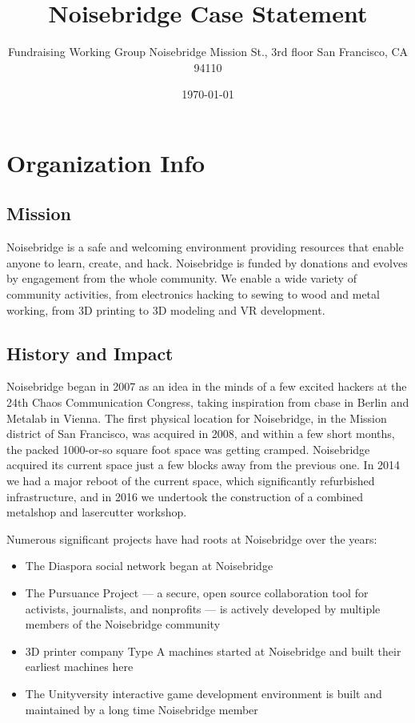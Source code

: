\documentclass[12pt]{article}
\title{Noisebridge Case Statement}
\author{Fundraising Working Group \newline Noisebridge \newline 2169 Mission St., 3rd floor \newline San Francisco, CA 94110}
\date{\today}
\begin{document}
\maketitle

\tableofcontents
\clearpage

\section{Organization Info}

\subsection{Mission}

Noisebridge is a safe and welcoming environment providing resources that enable anyone to learn, create, and hack. Noisebridge is funded by donations and evolves by engagement from the whole community. We enable a wide variety of community activities, from electronics hacking to sewing to wood and metal working, from 3D printing to 3D modeling and VR development.

\subsection{History and Impact}

Noisebridge began in 2007 as an idea in the minds of a few excited hackers at the 24th Chaos Communication Congress, taking inspiration from cbase in Berlin and Metalab in Vienna. The first physical location for Noisebridge, in the Mission district of San Francisco, was acquired in 2008, and within a few short months, the packed 1000-or-so square foot space was getting cramped. Noisebridge acquired its current space just a few blocks away from the previous one. In 2014 we had a major reboot of the current space, which significantly refurbished infrastructure, and in 2016 we undertook the construction of a combined metalshop and lasercutter workshop.

Numerous significant projects have had roots at Noisebridge over the years:

\vspace{0.5em}

\begin{itemize}
    \item The Diaspora social network began at Noisebridge
    \item The Pursuance Project — a secure, open source collaboration tool for activists, journalists, and nonprofits — is actively developed by multiple members of the Noisebridge community
    \item 3D printer company Type A machines started at Noisebridge and built their earliest machines here
    \item The Unityversity interactive game development environment is built and maintained by a long time Noisebridge member
\end{itemize}
\end{document}
